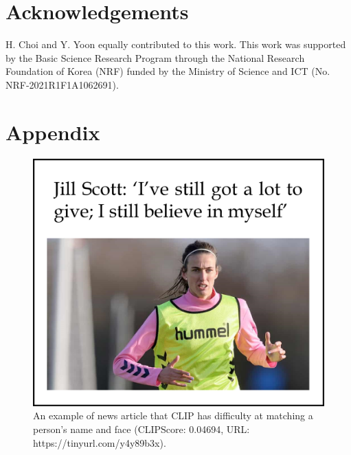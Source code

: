 \documentclass[11pt]{article}
\begin{document}
\section*{Acknowledgements}
H. Choi and Y. Yoon equally contributed to this work. This work was supported by the Basic Science Research Program through the National Research Foundation of Korea (NRF) funded by the Ministry of Science and ICT (No. NRF-2021R1F1A1062691).




\appendix

\renewcommand{\thefigure}{A\arabic{figure}}

\setcounter{figure}{0}
\setcounter{table}{0}

\section{Appendix}
\label{sec:appendix}

\begin{figure}[ht]
    \centering
    \includegraphics[width=\linewidth]{fig/appendix1.png}
    \caption{An example of news article that CLIP has difficulty at matching a person's name and face (CLIPScore: 0.04694, URL: https://tinyurl.com/y4y89b3x).}
    \label{fig:appendix1}
\end{figure}

\setcounter{table}{0}
\renewcommand{\thetable}{A\arabic{table}}
\label{sec:appendix2}
\end{document}
